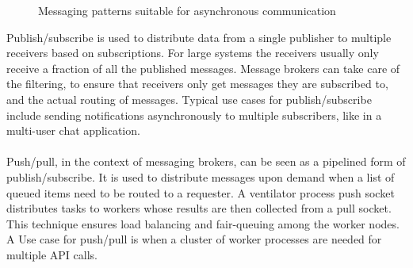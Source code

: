 \begin{figure}[h!]
	\centering
	 \hfill
	\caption{Messaging patterns suitable for asynchronous communication \cite{hintjens2010zeromq}}
\end{figure}

\noindent
Publish/subscribe is used to distribute data from a single publisher to multiple receivers based on subscriptions. For large systems the receivers usually only receive a fraction of all the published messages. Message brokers can take care of the filtering, to ensure that receivers only get messages they are subscribed to, and the actual routing of messages. Typical use cases for publish/subscribe include sending notifications asynchronously to multiple subscribers, like in a multi-user chat application.
\\ \\
Push/pull, in the context of messaging brokers, can be seen as a pipelined form of publish/subscribe. It is used to distribute messages upon demand when a list of queued items need to be routed to a requester. A ventilator process push socket distributes tasks to workers whose results are then collected from a pull socket. This technique ensures load balancing and fair-queuing among the worker nodes. A Use case for push/pull is when a cluster of worker processes are needed for multiple API calls.

